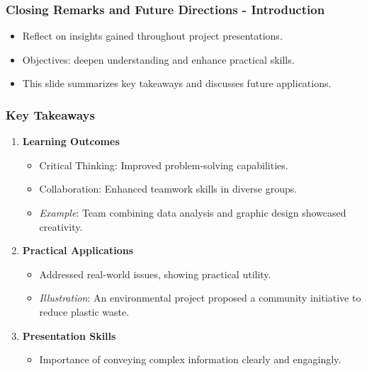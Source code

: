 \documentclass{beamer}
\begin{document}
\begin{frame}[fragile]
    \frametitle{Closing Remarks and Future Directions - Introduction}
    \begin{itemize}
        \item Reflect on insights gained throughout project presentations.
        \item Objectives: deepen understanding and enhance practical skills.
        \item This slide summarizes key takeaways and discusses future applications.
    \end{itemize}
\end{frame}

\begin{frame}[fragile]
    \frametitle{Key Takeaways}
    \begin{enumerate}
        \item \textbf{Learning Outcomes}
            \begin{itemize}
                \item Critical Thinking: Improved problem-solving capabilities.
                \item Collaboration: Enhanced teamwork skills in diverse groups.
                \item \textit{Example}: Team combining data analysis and graphic design showcased creativity.
            \end{itemize}
        
        \item \textbf{Practical Applications}
            \begin{itemize}
                \item Addressed real-world issues, showing practical utility.
                \item \textit{Illustration}: An environmental project proposed a community initiative to reduce plastic waste.
            \end{itemize}
        
        \item \textbf{Presentation Skills}
            \begin{itemize}
                \item Importance of conveying complex information clearly and engagingly.
            \end{itemize}
    \end{enumerate}
\end{frame}
\end{document}
